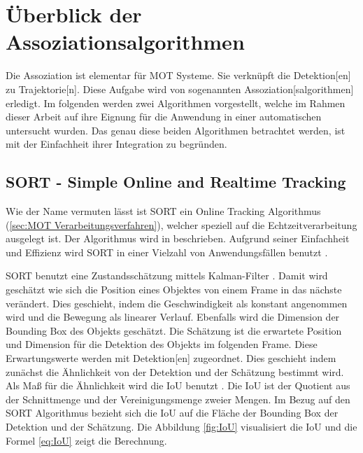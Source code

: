 \section{Überblick der Assoziationsalgorithmen}

Die \gls{Assoziation} ist elementar für \gls{MOT} Systeme. Sie verknüpft die \gls{Detektion}[en] zu \gls{Trajektorie}[n]. Diese Aufgabe wird von sogenannten \gls{Assoziation}[salgorithmen] erledigt. Im folgenden werden zwei Algorithmen vorgestellt, welche im Rahmen dieser Arbeit auf ihre Eignung für die Anwendung in einer automatischen  untersucht wurden. Das genau diese beiden Algorithmen betrachtet werden, ist mit der Einfachheit ihrer Integration zu begründen. 


\subsection{SORT - Simple Online and Realtime Tracking}
Wie der Name vermuten lässt ist \acrshort{SORT} ein \gls{Online Tracking} Algorithmus (\ref{sec:MOT Verarbeitungsverfahren}), welcher speziell auf die Echtzeitverarbeitung ausgelegt ist. Der Algorithmus wird in \cite{Bewley.2016} beschrieben. Aufgrund seiner Einfachheit und Effizienz wird \acrshort{SORT} in einer Vielzahl von Anwendungsfällen benutzt \cite{Chen.2023}. \par
{}

\acrshort{SORT} benutzt eine Zustandsschätzung mittels Kalman-Filter \cite{Kalman.1960}. Damit wird geschätzt wie sich die Position eines Objektes von einem \gls{Frame} in das nächste verändert. Dies geschieht, indem die Geschwindigkeit als konstant angenommen wird und die Bewegung als linearer Verlauf. Ebenfalls wird die Dimension der \gls{Bounding Box} des Objekts geschätzt. Die Schätzung ist die erwartete Position und Dimension für die \gls{Detektion} des Objekts im folgenden \gls{Frame}. Diese Erwartungswerte werden mit \gls{Detektion}[en] zugeordnet. Dies geschieht indem zunächst die Ähnlichkeit von der \gls{Detektion} und der Schätzung bestimmt wird. Als Maß für die Ähnlichkeit wird die \gls{IoU} benutzt  \cite{Bewley.2016}. Die \gls{IoU} ist der Quotient aus der Schnittmenge und der Vereinigungsmenge zweier Mengen. Im Bezug auf den \acrshort{SORT} Algorithmus bezieht sich die \gls{IoU} auf die Fläche der \gls{Bounding Box} der \gls{Detektion} und der Schätzung. Die Abbildung \ref{fig:IoU} visualisiert die \gls{IoU} und die Formel \ref{eq:IoU} zeigt die Berechnung. 

